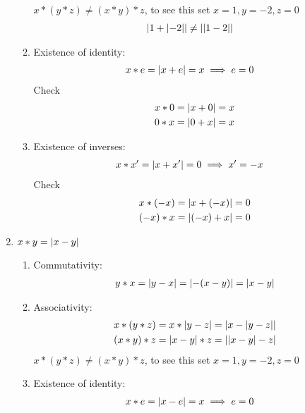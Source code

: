 \documentclass[nohyper,nobib]{tufte-handout}
\theoremstyle{definition}
\theoremstyle{remark}
\begin{document}
\begin{enumerate}
\begin{enumerate}[I]
                $x * (y * z) \neq (x * y) *z$, to see this set $x=1,y=-2,z=0$
                \begin{align}
                    &\abs{1 + \abs{-2}} \neq \abs{\abs{1 - 2}} \nonumber
                \end{align}
            \item Existence of identity:
                \begin{align}
                    &x * e = \abs{x + e} = x \implies e = 0
                \end{align}
                Check
                \begin{align}
                    &x * 0 = \abs{x + 0} = x \nonumber \\
                    &0 * x = \abs{0 + x} = x
                \end{align}
            \item Existence of inverses:
                \begin{align}
                    &x * x' = \abs{x + x'} = 0 \implies x' = -x
                \end{align}
                Check
                \begin{align}
                    &x * (-x) = \abs{x + (-x)} = 0 \nonumber \\
                    &(-x) * x = \abs{(-x) + x} = 0
                \end{align}
        \end{enumerate}
    \item $x * y = \abs{x - y}$
        \begin{enumerate}[I]
            \item Commutativity:
                \begin{align}
                    y * x = \abs{y - x} = \abs{-(x - y)} = \abs{x - y}
                \end{align}
            \item Associativity:
                \begin{align}
                    &x * (y * z) = x * \abs{y - z} = \abs{x - \abs{y - z}} \nonumber \\
                    &(x * y) * z = \abs{x - y}*z = \abs{\abs{x - y} - z}
                \end{align}
                $x * (y * z) \neq (x * y) *z$, to see this set $x=1,y=-2,z=0$
            \item Existence of identity:
                \begin{align}
                &x * e = \abs{x - e} = x \implies e = 0

\end{align}
\end{enumerate}
\end{enumerate}
\end{document}
